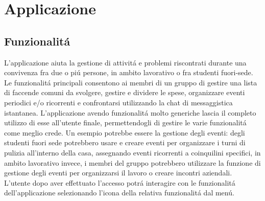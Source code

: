 \chapter{Applicazione}                %
\lhead[\fancyplain{}{\bfseries\thepage}]{\fancyplain{}{\bfseries\rightmark}}



\section{Funzionalit\'a}                 %
L'applicazione aiuta la gestione di attivit\'a e problemi riscontrati durante una convivenza fra due o pi\'u persone, in ambito lavorativo o fra studenti fuori-sede.\\
Le funzionalit\'a principali consentono ai membri di un gruppo di gestire una lista di faccende comuni da svolgere, gestire e dividere le spese, organizzare eventi periodici e/o ricorrenti e confrontarsi utilizzando la chat di messaggistica istantanea.
L'applicazione avendo funzionalit\'a molto generiche lascia il completo utilizzo di esse all'utente finale, permettendogli di gestire le varie funzionalit\'a come meglio crede. Un esempio potrebbe essere la gestione degli eventi: degli studenti fuori sede potrebbero usare e creare eventi per organizzare i turni di pulizia all'interno della casa, assegnando eventi ricorrenti a coinquilini specifici, in ambito lavorativo invece, i membri del gruppo potrebbero utilizzare la funzione di gestione degli eventi per organizzarsi il lavoro o creare incontri aziendali.\\
L'utente dopo aver effettuato l'accesso potr\'a interagire con le funzionalit\'a dell'applicazione selezionando l'icona della relativa funzionalit\'a dal men\'u.
\newpage




